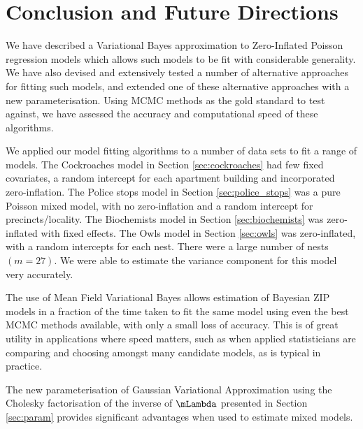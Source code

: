 \chapter{Conclusion and Future Directions}
\label{sec:chapter_2_conclusion}
		

We have described a Variational Bayes approximation to Zero-Inflated Poisson
regression models which allows such models to be fit with considerable
generality. We have also devised and extensively tested a number of alternative
approaches for fitting such models, and extended one of these alternative
approaches with a new parameterisation. Using MCMC methods as the gold standard
to test against, we have assessed the accuracy and computational speed of these
algorithms.
		
We applied our model fitting algorithms to a number of data sets to fit a range
of models. The Cockroaches model in Section \ref{sec:cockroaches} had few fixed
covariates, a random intercept for each apartment building and incorporated
zero-inflation. The Police stops model in Section \ref{sec:police_stops} was a
pure Poisson mixed model, with no zero-inflation and a random intercept for
precincts/locality. The Biochemists model in Section \ref{sec:biochemists} was
zero-inflated with fixed effects. The Owls model in Section \ref{sec:owls} was
zero-inflated,  with a random intercepts for each nest. There were a large
number of nests $(m=27)$. We were able to estimate the variance component for
this model very accurately.

The use of Mean Field Variational Bayes allows estimation of Bayesian ZIP
models in a fraction of the time taken to fit the same model using even the
best MCMC methods available, with only a small loss of accuracy. This is of
great utility in applications where speed matters, such as when applied
statisticians are comparing and choosing amongst many candidate models, as is
typical in practice.
		
The new parameterisation of Gaussian Variational Approximation using the
Cholesky factorisation of the inverse of $\mLambda$ presented in Section
\ref{sec:param} provides significant advantages when used to estimate mixed
models.

